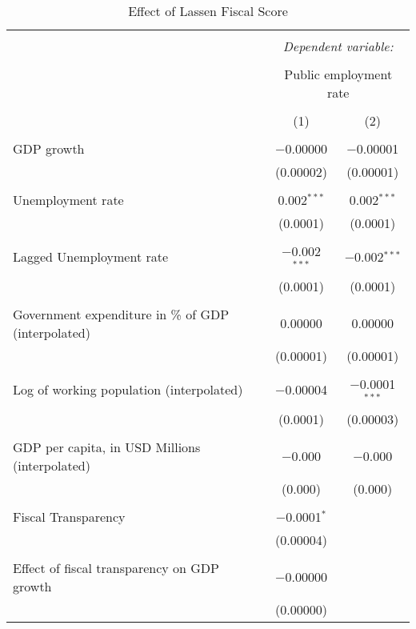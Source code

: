 
\begin{table}[!htbp] \centering 
  \caption{Effect of Lassen Fiscal Score} 
  \label{} 
\begin{tabular}{@{\extracolsep{5pt}}lcc} 
\\[-1.8ex]\hline 
\hline \\[-1.8ex] 
 & \multicolumn{2}{c}{\textit{Dependent variable:}} \\ 
\cline{2-3} 
\\[-1.8ex] & \multicolumn{2}{c}{Public employment rate} \\ 
\\[-1.8ex] & (1) & (2)\\ 
\hline \\[-1.8ex] 
 GDP growth & $-$0.00000 & $-$0.00001 \\ 
  & (0.00002) & (0.00001) \\ 
  & & \\ 
 Unemployment rate & 0.002$^{***}$ & 0.002$^{***}$ \\ 
  & (0.0001) & (0.0001) \\ 
  & & \\ 
 Lagged Unemployment rate & $-$0.002$^{***}$ & $-$0.002$^{***}$ \\ 
  & (0.0001) & (0.0001) \\ 
  & & \\ 
 Government expenditure in \% of GDP (interpolated) & 0.00000 & 0.00000 \\ 
  & (0.00001) & (0.00001) \\ 
  & & \\ 
 Log of working population (interpolated) & $-$0.00004 & $-$0.0001$^{***}$ \\ 
  & (0.0001) & (0.00003) \\ 
  & & \\ 
 GDP per capita, in USD Millions (interpolated) & $-$0.000 & $-$0.000 \\ 
  & (0.000) & (0.000) \\ 
  & & \\ 
 Fiscal Transparency & $-$0.0001$^{*}$ &  \\ 
  & (0.00004) &  \\ 
  & & \\ 
 Effect of fiscal transparency on GDP growth & $-$0.00000 &  \\ 
  & (0.00000) &  \\ 

\end{tabular}
\end{table}
